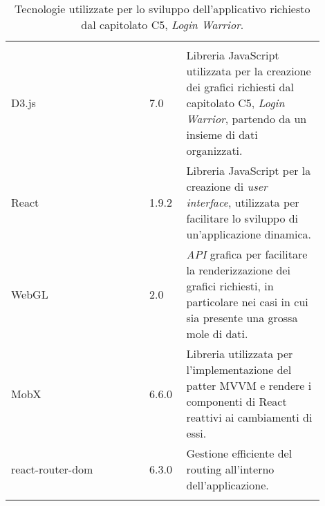 {\begin{longtable}{>{\raggedright\arraybackslash}m{0.40\linewidth}m{0.10\linewidth}m{0.40\linewidth}}
    \rowcolor[RGB]{47, 106, 73}
    \multicolumn{3}{>{\centering\arraybackslash}m{0.953\linewidth}}{\textcolor{white}{\textbf{Librerie e Framework}}}\\

    \rowcolor[RGB]{216, 235, 171}
    D3.js & 7.0 & Libreria JavaScript utilizzata per la creazione dei grafici richiesti dal capitolato C5, \textit{Login Warrior}, partendo da un insieme di dati organizzati.\\

    \rowcolor[RGB]{233, 245, 206}
    React & 1.9.2 & Libreria JavaScript per la creazione di \textit{user interface}, utilizzata per facilitare lo sviluppo di un'applicazione dinamica.\\

    \rowcolor[RGB]{216, 235, 171}
    WebGL & 2.0 & \textit{API} grafica per facilitare la renderizzazione dei grafici richiesti, in particolare nei casi in cui sia presente una grossa mole di dati.\\

    \rowcolor[RGB]{233, 245, 206}
    MobX & 6.6.0 & Libreria utilizzata per l'implementazione del patter MVVM e
    rendere i componenti di React reattivi ai cambiamenti di essi.\\

    \rowcolor[RGB]{216, 235, 171}
    react-router-dom & 6.3.0 & Gestione efficiente del routing all'interno dell'applicazione.\\

    \caption{Tecnologie utilizzate per lo sviluppo dell'applicativo richiesto dal capitolato C5, \textit{Login Warrior}.}
\end{longtable}
}
